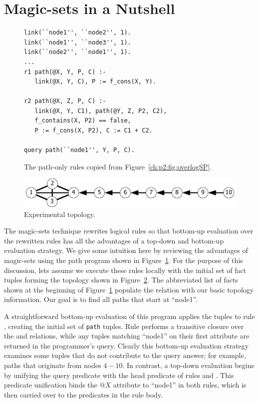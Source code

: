 \section{Magic-sets in a Nutshell}
\label{ch:magic:sec:review}

\begin{figure}[!t]
\ssp
\centering
\begin{lstlisting}
link(``node1'', ``node2'', 1).
link(``node1'', ``node3'', 1).
link(``node2'', ``node1'', 1).
...
r1 path(@X, Y, P, C) :-
   link(@X, Y, C), P := f_cons(X, Y).

r2 path(@X, Z, P, C) :-
   link(@X, Y, C1), path(@Y, Z, P2, C2),
   f_contains(X, P2) == false,
   P := f_cons(X, P2), C := C1 + C2.

query path(``node1'', Y, P, C).
\end{lstlisting}
\caption{\label{ch:magic:fig:basicSP}The path-only rules copied from Figure~\ref{ch:p2:fig:overlogSP}.}
\end{figure}

\begin{figure}
\centering
\includegraphics[scale=1.2]{figures/Topology}
\caption{Experimental topology.}
\label{ch:magic:fig:topo}
\end{figure}

The magic-sets technique rewrites logical rules so that bottom-up evaluation
over the rewritten rules has all the advantages of a top-down and bottom-up
evaluation strategy.  We give some intuition here by reviewing the advantages
of magic-sets using the path program shown in
Figure~\ref{ch:magic:fig:basicSP}.  For the purpose of this discussion, lets
assume we execute these rules locally with the initial set of  fact
tuples forming the topology shown in Figure~\ref{ch:magic:fig:topo}.  The
abbreviated list of facts shown at the beginning of
Figure~\ref{ch:magic:fig:basicSP} populate the  relation with our
basic topology information.  Our goal is to find all paths that start at
``node1''.

A straightforward bottom-up evaluation of this program applies the 
tuples to rule , creating the initial set of {\tt path} tuples.  Rule
 performs a transitive closure over the  and 
relations, while any  tuples matching ``node1'' on their first
attribute are returned in the programmer's query.  Clearly this bottom-up
evaluation strategy examines some  tuples that do not contribute to
the query answer; for example, paths that originate from nodes $4-10$. In
contrast, a top-down evaluation begins by unifying the query predicate with the
head predicate of rules  and .  This  predicate
unification binds the $@X$ attribute to ``node1'' in both rules, which is then
carried over to the predicates in the rule body.  

